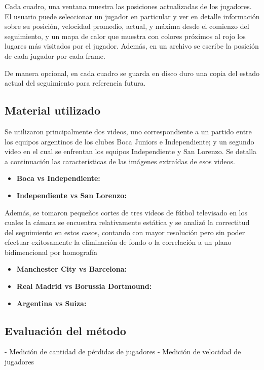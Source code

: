 Cada cuadro, una ventana muestra las posiciones actualizadas de los jugadores. El usuario puede seleccionar un jugador en particular y ver en detalle información sobre su posición, velocidad promedio, actual, y máxima desde el comienzo del seguimiento, y un mapa de calor que muestra con colores próximos al rojo los lugares más visitados por el jugador. Además, en un archivo se escribe la posición de cada jugador por cada frame.

De manera opcional, en cada cuadro se guarda en disco duro una copia del estado actual del seguimiento para referencia futura.

\subsection{Material utilizado}

Se utilizaron principalmente dos videos, uno correspondiente a un partido entre los equipos argentinos de los clubes Boca Juniors e Independiente; y un segundo video en el cual se enfrentan los equipos Independiente y San Lorenzo. Se detalla a continuación las características de las imágenes extraídas de esos videos.

\begin{itemize}
  \item \textbf{Boca vs Independiente:} 
  \item \textbf{Independiente vs San Lorenzo:}
\end{itemize}

Además, se tomaron pequeños cortes de tres videos de fútbol televisado en los cuales la cámara se encuentra relativamente estática y se analizó la correctitud del seguimiento en estos casos, contando con mayor resolución pero sin poder efectuar exitosamente la eliminación de fondo o la correlación a un plano bidimencional por homografía %

\begin{itemize}
  \item \textbf{Manchester City vs Barcelona:}
  \item \textbf{Real Madrid vs Borussia Dortmound:}
  \item \textbf{Argentina vs Suiza:}
\end{itemize}

\subsection{Evaluación del método}
  - Medición de cantidad de pérdidas de jugadores
  - Medición de velocidad de jugadores
